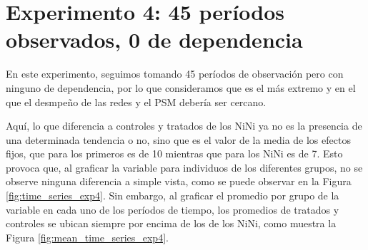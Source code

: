\documentclass[../../main.tex]{subfiles}
\begin{document}
\section{Experimento 4: 45 períodos observados, 0 de dependencia} \label{sec:exp4}
En este experimento, seguimos tomando 45 períodos de observación pero con ninguno de
dependencia, por lo que consideramos que es el más extremo y en el que el desmpeño de las
redes y el PSM debería ser cercano.

Aquí, lo que diferencia a controles y tratados de los NiNi ya no es la presencia de una
determinada tendencia o no, sino que es el valor de la media de los efectos fijos,
que para los primeros es de 10 mientras que para los NiNi es de 7. Esto provoca que, al
graficar la variable para individuos de los diferentes grupos, no se observe ninguna
diferencia a simple vista, como se puede observar en la Figura \ref{fig:time_series_exp4}.
Sin embargo, al graficar el promedio por grupo de la variable en cada uno de los períodos
de tiempo, los promedios de tratados y controles se ubican siempre por encima de los de
los NiNi, como muestra la Figura \ref{fig:mean_time_series_exp4}.
\end{document}
